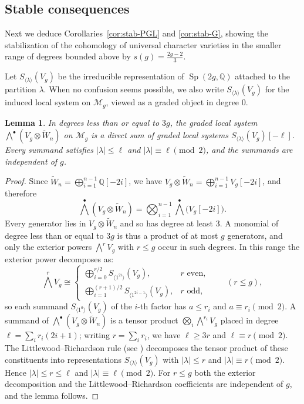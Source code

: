 \documentclass[11pt,reqno]{amsart}
\theoremstyle{plain} %
\newtheorem{lemma}[theorem]{Lemma}
\theoremstyle{definition}
\newcommand{\QQ}{\mathbb{Q}}
\newcommand{\M}{\mathcal{M}}
\DeclareMathOperator{\Sp}{Sp}
\newcommand{\tW}{\widetilde{W}}
\begin{document}
\subsection{Stable consequences} \label{subsec: stable consequences}

Next we deduce Corollaries~\ref{cor:stab-PGL} and \ref{cor:stab-G}, showing the stabilization of the cohomology of universal character varieties in the smaller range of degrees bounded above by $s(g) = \frac{2g-2}{3}$.

Let $S_{\langle \lambda \rangle}(V_g)$ be the irreducible representation of $\Sp(2g,\QQ)$ attached to the partition $\lambda$. When no confusion seems possible, we also write $S_{\langle \lambda \rangle}(V_g)$ for the induced local system on $\M_g$, viewed as a graded object in degree $0$.

\begin{lemma}\label{lemma: exterior decomposition}
In degrees less than or equal to $3g$, the graded local system $\bigwedge^\bullet(V_g \otimes \tW_n)$ on $\M_g$ is a direct sum of graded local systems $S_{\langle \lambda \rangle}(V_g)[-\ell]$. Every summand satisfies $|\lambda| \le \ell$ and $|\lambda| \equiv \ell \pmod 2$, and the summands are independent of $g$.
\end{lemma}

\begin{proof}
Since $\tW_n = \bigoplus_{i=1}^{n-1} \QQ[-2i]$, we have $V_g \otimes \tW_n = \bigoplus_{i=1}^{n-1} V_g[-2i]$, and therefore
\[
\textstyle{\bigwedge^\bullet}(V_g \otimes \tW_n) = \bigotimes_{i=1}^{n-1} \textstyle{\bigwedge^\bullet}\big(V_g[-2i]\big).
\]
Every generator lies in $V_g \otimes \tW_n$ and so has degree at least $3$. A monomial of degree less than or equal to $3g$ is thus a product of at most $g$ generators, and only the exterior powers $\textstyle{\bigwedge^r} V_g$ with $r \le g$ occur in such degrees. In this range the exterior power decomposes as:
\[
\textstyle{\bigwedge^r} V_g \cong
\begin{cases}
\bigoplus_{i=0}^{r/2} S_{\langle 1^{2i} \rangle}(V_g), & r \text{ even},\\
\bigoplus_{i=1}^{(r+1)/2} S_{\langle 1^{2i-1} \rangle}(V_g), & r \text{ odd},
\end{cases}
\qquad (r \le g),
\]
so each summand $S_{\langle 1^a \rangle}(V_g)$ of the $i$-th factor has $a \le r_i$ and $a \equiv r_i \pmod 2$. A summand of $\bigwedge^\bullet(V_g \otimes \tW_n)$ is a tensor product $\bigotimes_i \bigwedge^{r_i} V_g$ placed in degree $\ell = \sum_i r_i(2i+1)$; writing $r = \sum_i r_i$, we have $\ell \ge 3r$ and $\ell \equiv r \pmod 2$. The Littlewood--Richardson rule (see \cite{YoungDiagrammaticMethods}) decomposes the tensor product of these constituents into representations $S_{\langle \lambda \rangle}(V_g)$ with $|\lambda| \le r$ and $|\lambda| \equiv r \pmod 2$. Hence $|\lambda| \le r \le \ell$ and $|\lambda| \equiv \ell \pmod 2$. For $r \le g$ both the exterior decomposition and the Littlewood--Richardson coefficients are independent of $g$, and the lemma follows. \end{proof}
\end{document}
